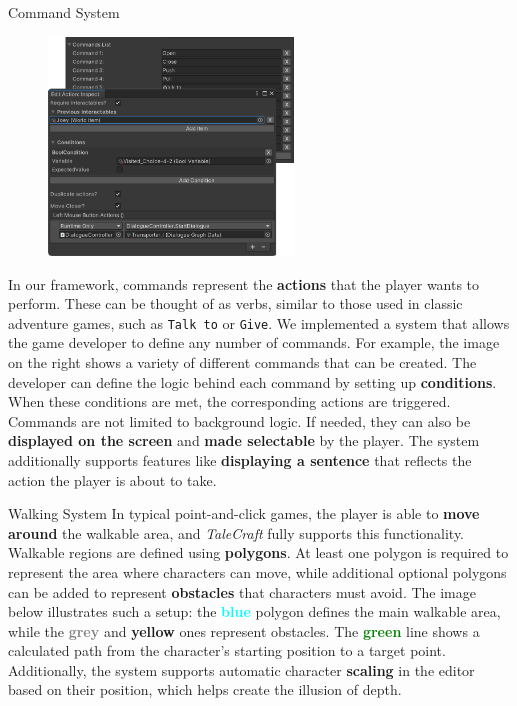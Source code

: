 \documentclass[portrait,a0paper,fontscale=0.35]{baposter}
\begin{document}
\begin{poster}
\begin{posterbox}[column=0, span=1, name=cs, below=architecture]{Command System}

\begin{figure}
\centering
\includegraphics[width=0.58\textwidth]{img/cs2.png}
\end{figure}

In our framework, commands represent the \textbf{actions} that the player wants to perform. These can be thought of as verbs, similar to those used in classic adventure games, such as \texttt{Talk to} or \texttt{Give}. We implemented a system that allows the game developer to define any number of commands. For example, the image on the right shows a variety of different commands that can be created. The developer can define the logic behind each command by setting up \textbf{conditions}. When these conditions are met, the corresponding actions are triggered. Commands are not limited to background logic. If needed, they can also be \textbf{displayed on the screen} and \textbf{made selectable} by the player. The system additionally supports features like \textbf{displaying a sentence} that reflects the action the player is about to take.

\end{posterbox}

\begin{posterbox}[column=0, span=1, name=ws, below=cs]{Walking System}
In typical point-and-click games, the player is able to \textbf{move around} the walkable area, and \textit{TaleCraft} fully supports this functionality. Walkable regions are defined using \textbf{polygons}. At least one polygon is required to represent the area where characters can move, while additional optional polygons can be added to represent \textbf{obstacles} that characters must avoid. The image below illustrates such a setup: the \textcolor{cyan}{\textbf{blue}} polygon defines the main walkable area, while the \textcolor{gray}{\textbf{grey}} and \textcolor{Dandelion}{\textbf{yellow}} ones represent obstacles. The \textcolor{green}{\textbf{green}} line shows a calculated path from the character's starting position to a target point. Additionally, the system supports automatic character \textbf{scaling} in the editor based on their position, which helps create the illusion of depth. 


\end{posterbox}
\end{poster}
\end{document}
